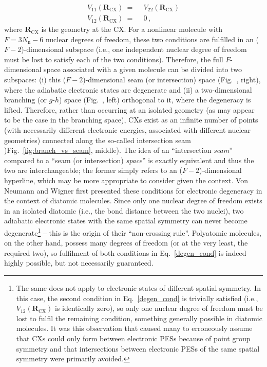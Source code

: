 \documentclass[9pt,bestpractices]{livecoms}
\newcommand{\R}{\mathbf{R}}
\begin{document}
\begin{equation}
\label{degen_cond}
\begin{split}
    V_{11}(\R_{\text{CX}}) \: =& \:\: V_{22}(\R_{\text{CX}})\\
    V_{12}(\R_{\text{CX}}) \: =& \:\: 0 \, ,
\end{split}
\end{equation}
where $\R_\text{CX}$ is the geometry at the CX. For a nonlinear molecule with $F = 3N_\text{n} - 6$ nuclear degrees of freedom, these two conditions are fulfilled in an ($F - 2$)-dimensional subspace (i.e., one independent nuclear degree of freedom must be lost to satisfy each of the two conditions).\cite{malhado2014non}
Therefore, the full $F$-dimensional space associated with a given molecule can be divided into two subspaces: (i) this ($F - 2$)-dimensional seam (or intersection) space\cite{atchity_potential_1991} (Fig.~, right), where the adiabatic electronic states are degenerate and (ii) a two-dimensional branching\cite{atchity_potential_1991} (or $g$-$h$)\cite{yarkony_conical_2001} space (Fig.~, left) orthogonal to it, where the degeneracy is lifted.
Therefore, rather than occurring at an isolated geometry (as may appear to be the case in the branching space), CXs exist as an infinite number of points (with necessarily different electronic energies, associated with different nuclear geometries) connected\cite{B407959K, coe2008extent, morreale2024topology, barbatti2004photochemistry} along the so-called intersection seam )Fig.~\ref{fig:branch_vs_seam}, middle).
The idea of an ``intersection \textit{seam}'' compared to a ``seam (or intersection) \textit{space}'' is exactly equivalent and thus the two are interchangeable; the former simply refers to an ($F - 2$)-dimensional hyperline, which may be more appropriate to consider given the context.
Von Neumann and Wigner first presented these conditions for electronic degeneracy in the context of diatomic molecules.
Since only one nuclear degree of freedom exists in an isolated diatomic (i.e., the bond distance between the two nuclei), two adiabatic electronic states with the same spatial symmetry can never become degenerate\footnote{
The same does not apply to electronic states of different spatial symmetry. 
In this case, the second condition in Eq.~\eqref{degen_cond} is trivially satisfied (i.e., $V_{12}(\R_{\text{CX}})$ is identically zero), so only one nuclear degree of freedom must be lost to fulfil the remaining condition, something generally possible in diatomic molecules. 
It was this observation that caused many to erroneously assume that CXs could only form between electronic PESs because of point group symmetry and that intersections between electronic PESs of the same spatial symmetry were primarily avoided.\cite{domcke_conical_2004}
} 
-- this is the origin of their ``non-crossing rule''.\cite{vonneumann1929eigenvalues}
Polyatomic molecules, on the other hand, possess many degrees of freedom (or at the very least, the required two), so fulfilment of both conditions in Eq.~\eqref{degen_cond} is indeed highly possible, but not necessarily guaranteed.\cite{yarkony_conical_1998}
\end{document}
